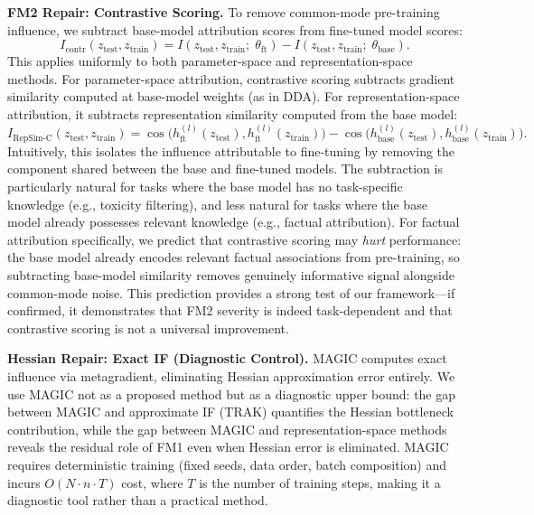 \documentclass{article}
\begin{document}
\textbf{FM2 Repair: Contrastive Scoring.} To remove common-mode pre-training influence, we subtract base-model attribution scores from fine-tuned model scores:
\begin{equation}
I_\text{contr}(z_\text{test}, z_\text{train}) = I(z_\text{test}, z_\text{train};\; \theta_\text{ft}) - I(z_\text{test}, z_\text{train};\; \theta_\text{base}).
\label{eq:contrastive}
\end{equation}
This applies uniformly to both parameter-space and representation-space methods. For parameter-space attribution, contrastive scoring subtracts gradient similarity computed at base-model weights (as in DDA). For representation-space attribution, it subtracts representation similarity computed from the base model:
\begin{equation}
I_\text{RepSim-C}(z_\text{test}, z_\text{train}) = \cos\bigl(h_\text{ft}^{(l)}(z_\text{test}), h_\text{ft}^{(l)}(z_\text{train})\bigr) - \cos\bigl(h_\text{base}^{(l)}(z_\text{test}), h_\text{base}^{(l)}(z_\text{train})\bigr).
\label{eq:repsim_c}
\end{equation}
Intuitively, this isolates the influence attributable to fine-tuning by removing the component shared between the base and fine-tuned models. The subtraction is particularly natural for tasks where the base model has no task-specific knowledge (e.g., toxicity filtering), and less natural for tasks where the base model already possesses relevant knowledge (e.g., factual attribution). For factual attribution specifically, we predict that contrastive scoring may \emph{hurt} performance: the base model already encodes relevant factual associations from pre-training, so subtracting base-model similarity removes genuinely informative signal alongside common-mode noise. This prediction provides a strong test of our framework---if confirmed, it demonstrates that FM2 severity is indeed task-dependent and that contrastive scoring is not a universal improvement.

\textbf{Hessian Repair: Exact IF (Diagnostic Control).} MAGIC computes exact influence via metagradient, eliminating Hessian approximation error entirely. We use MAGIC not as a proposed method but as a diagnostic upper bound: the gap between MAGIC and approximate IF (TRAK) quantifies the Hessian bottleneck contribution, while the gap between MAGIC and representation-space methods reveals the residual role of FM1 even when Hessian error is eliminated. MAGIC requires deterministic training (fixed seeds, data order, batch composition) and incurs $O(N \cdot n \cdot T)$ cost, where $T$ is the number of training steps, making it a diagnostic tool rather than a practical method.
\end{document}
